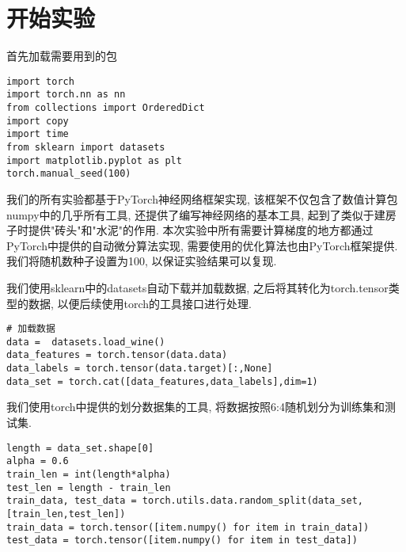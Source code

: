 \section{开始实验}
首先加载需要用到的包
\begin{lstlisting}
import torch
import torch.nn as nn
from collections import OrderedDict
import copy
import time
from sklearn import datasets
import matplotlib.pyplot as plt
torch.manual_seed(100)
\end{lstlisting}
我们的所有实验都基于PyTorch神经网络框架实现, 该框架不仅包含了数值计算包numpy中的几乎所有工具, 还提供了编写神经网络的基本工具, 起到了类似于建房子时提供"砖头"和"水泥"的作用.
本次实验中所有需要计算梯度的地方都通过PyTorch中提供的自动微分算法实现, 需要使用的优化算法也由PyTorch框架提供.
我们将随机数种子设置为100, 以保证实验结果可以复现.

我们使用sklearn中的datasets自动下载并加载数据, 之后将其转化为torch.tensor类型的数据, 以便后续使用torch的工具接口进行处理.
\begin{lstlisting}
# 加载数据
data =  datasets.load_wine()
data_features = torch.tensor(data.data)
data_labels = torch.tensor(data.target)[:,None]
data_set = torch.cat([data_features,data_labels],dim=1)
\end{lstlisting}

我们使用torch中提供的划分数据集的工具, 将数据按照6:4随机划分为训练集和测试集.
\begin{lstlisting}
length = data_set.shape[0]
alpha = 0.6
train_len = int(length*alpha)
test_len = length - train_len
train_data, test_data = torch.utils.data.random_split(data_set,[train_len,test_len])
train_data = torch.tensor([item.numpy() for item in train_data])
test_data = torch.tensor([item.numpy() for item in test_data])
\end{lstlisting}

